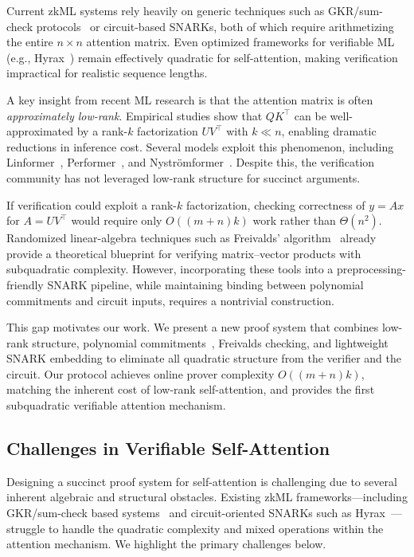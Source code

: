 \documentclass[11pt]{article}
\begin{document}
Current zkML systems rely heavily on generic techniques such as
GKR/sum-check protocols~\cite{goldwasser2008gkr} or circuit-based SNARKs,
both of which require arithmetizing the entire $n \times n$ attention matrix.
Even optimized frameworks for verifiable ML (e.g., Hyrax~\cite{zhang2018hyrax})
remain effectively quadratic for self-attention,
making verification impractical for realistic sequence lengths.

A key insight from recent ML research is that the attention matrix
is often \emph{approximately low-rank}.
Empirical studies show that $QK^\top$ can be well-approximated by a
rank-$k$ factorization $U V^\top$ with $k \ll n$, enabling dramatic
reductions in inference cost.
Several models exploit this phenomenon, including
Linformer~\cite{wang2020linformer},
Performer~\cite{choromanski2021performer},
and Nystr\"omformer~\cite{xiong2021nystromformer}.
Despite this, the verification community has not leveraged
low-rank structure for succinct arguments.

If verification could exploit a rank-$k$ factorization,
checking correctness of $y = A x$ for $A = U V^\top$
would require only $O((m+n)k)$ work rather than $\Theta(n^2)$.
Randomized linear-algebra techniques such as Freivalds' algorithm~\cite{freivalds1979fast}
already provide a theoretical blueprint for verifying matrix–vector products
with subquadratic complexity.
However, incorporating these tools into a preprocessing-friendly SNARK pipeline,
while maintaining binding between polynomial commitments and circuit inputs,
requires a nontrivial construction.

This gap motivates our work.
We present a new proof system that combines low-rank structure,
polynomial commitments~\cite{kate2010polynomial},
Freivalds checking, and lightweight SNARK embedding
to eliminate all quadratic structure from the verifier and the circuit.
Our protocol achieves online prover complexity $O((m+n)k)$,
matching the inherent cost of low-rank self-attention,
and provides the first subquadratic verifiable attention mechanism.


\subsection{Challenges in Verifiable Self-Attention}
Designing a succinct proof system for self-attention is challenging due 
to several inherent algebraic and structural obstacles. Existing zkML 
frameworks---including GKR/sum-check based systems~\cite{goldwasser2008gkr} and 
circuit-oriented SNARKs such as Hyrax~\cite{zhang2018hyrax}---struggle to 
handle the quadratic complexity and mixed operations within the 
attention mechanism. We highlight the primary challenges below.
\end{document}
